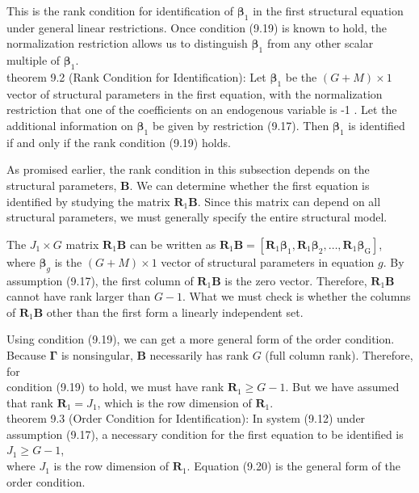 \documentclass[10pt]{article}
\begin{document}
This is the rank condition for identification of $\boldsymbol{\beta}_{1}$ in the first structural equation under general linear restrictions. Once condition (9.19) is known to hold, the normalization restriction allows us to distinguish $\boldsymbol{\beta}_{1}$ from any other scalar multiple of $\boldsymbol{\beta}_{1}$.\\
theorem 9.2 (Rank Condition for Identification): Let $\boldsymbol{\beta}_{1}$ be the $(G+M) \times 1$ vector of structural parameters in the first equation, with the normalization restriction that one of the coefficients on an endogenous variable is -1 . Let the additional information on $\boldsymbol{\beta}_{1}$ be given by restriction (9.17). Then $\boldsymbol{\beta}_{1}$ is identified if and only if the rank condition (9.19) holds.

As promised earlier, the rank condition in this subsection depends on the structural parameters, $\mathbf{B}$. We can determine whether the first equation is identified by studying the matrix $\mathbf{R}_{1} \mathbf{B}$. Since this matrix can depend on all structural parameters, we must generally specify the entire structural model.

The $J_{1} \times G$ matrix $\mathbf{R}_{1} \mathbf{B}$ can be written as $\mathbf{R}_{1} \mathbf{B}=\left[\mathbf{R}_{1} \boldsymbol{\beta}_{1}, \mathbf{R}_{1} \boldsymbol{\beta}_{2}, \ldots, \mathbf{R}_{1} \boldsymbol{\beta}_{\mathrm{G}}\right]$, where $\boldsymbol{\beta}_{g}$ is the $(G+M) \times 1$ vector of structural parameters in equation $g$. By assumption (9.17), the first column of $\mathbf{R}_{1} \mathbf{B}$ is the zero vector. Therefore, $\mathbf{R}_{1} \mathbf{B}$ cannot have rank larger than $G-1$. What we must check is whether the columns of $\mathbf{R}_{1} \mathbf{B}$ other than the first form a linearly independent set.

Using condition (9.19), we can get a more general form of the order condition. Because $\boldsymbol{\Gamma}$ is nonsingular, $\mathbf{B}$ necessarily has rank $G$ (full column rank). Therefore, for\\
condition (9.19) to hold, we must have rank $\mathbf{R}_{1} \geq G-1$. But we have assumed that rank $\mathbf{R}_{1}=J_{1}$, which is the row dimension of $\mathbf{R}_{1}$.\\
theorem 9.3 (Order Condition for Identification): In system (9.12) under assumption (9.17), a necessary condition for the first equation to be identified is\\
$J_{1} \geq G-1$,\\
where $J_{1}$ is the row dimension of $\mathbf{R}_{1}$. Equation (9.20) is the general form of the order condition.
\end{document}
